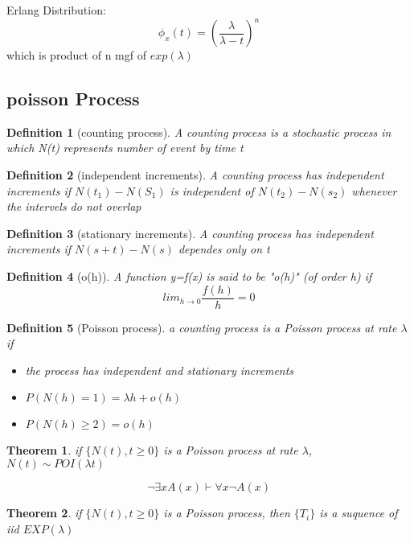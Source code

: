 \documentclass[10pt]{article}
\theoremstyle{break}
\newtheorem{thm}{Theorem}[subsection]
\newtheorem{defn}{Definition}[subsection]
\begin{document}
    Erlang Distribution:
    $$\phi_x(t)=(\frac{\lambda}{\lambda -t})^n$$ which is product of n mgf of $exp(\lambda)$
    \newpage
    \subsection{poisson Process}
    \begin{defn}[counting process]
        A counting process is a stochastic process in which N(t) represents number of event by time t 
    \end{defn}
    \begin{defn}[independent increments]
        A counting process has independent increments if $N(t_1)-N(S_1)$ is independent of 
        $N(t_2)-N(s_2)$ whenever the intervels do not overlap
    \end{defn}
    \begin{defn}[stationary increments]
        A counting process has independent increments if $N(s+t)-N(s)$ dependes only on t 
    \end{defn}
    \begin{defn}[o(h)]
        A function y=f(x) is said to be "o(h)" (of order h) if 
        $$lim_{h\rightarrow0}\frac{f(h)}{h}=0$$
    \end{defn}

    \begin{defn}[Poisson process]
        a counting process is a Poisson process at rate $\lambda$ if 
        \begin{itemize}
            \item the process has independent and stationary increments 
            \item $P(N(h)=1)=\lambda h +o(h)$
            \item $P(N(h)\geq 2)=o(h)$
        \end{itemize}
    \end{defn}

    \begin{thm}
        if $\{N(t), t\geq 0\}$ is a Poisson process at rate $\lambda$, 
        $N(t)\sim  POI(\lambda t)$
    \end{thm}
$$\neg\exists xA(x) \vdash \forall x \neg A(x)$$
    \begin{thm}
        if $\{N(t), t\geq 0\}$ is a Poisson process, then $\{T_i\}$ is a suquence of iid $EXP(\lambda)$
    \end{thm}
\end{document}

